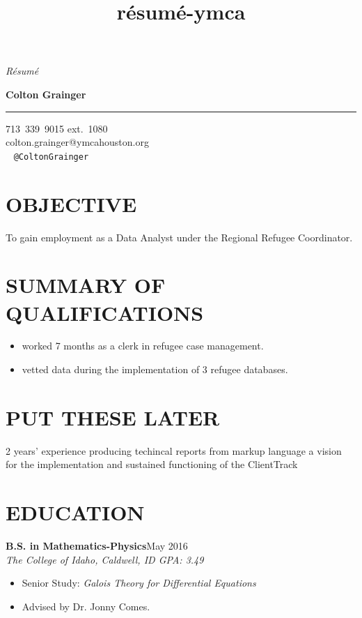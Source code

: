 \documentclass[margin]{res}
\title{résumé-ymca}
\newcommand\textbox[1]{\parbox{.333\textwidth}{#1} }
\newcommand\degree[3]{\textbf{#1}\hfill {#2}\\ \emph{#3} }
\newenvironment{details}{\begin{itemize}[itemsep=0.6pt,topsep=2.2pt] }{\end{itemize} }
\begin{document}
 

\noindent\textbox{\emph{R\'esum\'e}\hfill} \textbox{\hfill{\large\bf Colton Grainger}\hfill }

\vspace{-20pt}
\rule{\textwidth}{1pt}

\vspace{-20pt}
\begin{flushright} 
713~339~9015 ext.\ 1080\\ colton.grainger@ymcahouston.org\\ \faTwitter\ \faGithub\hspace{1ex} \texttt{@ColtonGrainger} 
\end{flushright}
\vspace{-24pt}

\begin{resume}

\section{OBJECTIVE}
To gain employment as a Data Analyst under the Regional Refugee Coordinator.

\section{SUMMARY OF QUALIFICATIONS}
\begin{itemize}
    \item worked 7 months as a clerk in refugee case management.
    \item vetted data during the implementation of 3 refugee databases.

\end{itemize}
\section{PUT THESE LATER}
2 years' experience producing techincal reports from markup language
a vision for the implementation and sustained functioning of the ClientTrack

\section{EDUCATION}
\degree{B.S. in Mathematics-Physics}{May 2016}{The College of Idaho, Caldwell, ID \hfill {\rm GPA: 3.49}}
    \begin{details}
        \item Senior Study: \emph{Galois Theory for Differential Equations}
        \item Advised by Dr. Jonny Comes.
    \end{details}


\end{resume}
\end{document}
